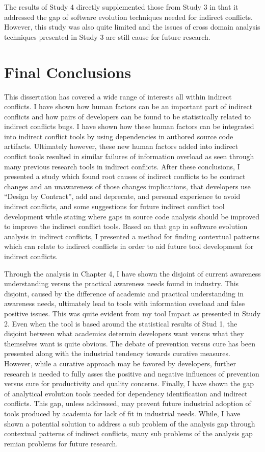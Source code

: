 The results of Study 4 directly supplemented those from Study 3 in that it addressed the gap of software evolution techniques
needed for indirect conflicts. However, this study was also quite limited and the issues of cross domain analysis techniques
presented in Study 3 are still cause for future research.

\section{Final Conclusions}

This dissertation has covered a wide range of interests all within indirect conflicts. I have shown how human factors can
be an important part of indirect conflicts and how pairs of developers can be found to be statistically related to indirect
conflicts bugs. I have shown how these human factors can be integrated into indirect conflict tools by using dependencies in 
authored source code artifacts. Ultimately however, these new human factors added into indirect conflict tools resulted in
similar failures of information overload as seen through many previous research tools in indirect conflicts. After these conclusions,
I presented a study which found root causes of indirect conflicts to be contract changes and an unawareness of those changes
implications, that developers use ``Design by Contract'', add and deprecate, and personal experience to avoid indirect conflicts,
and some suggestions for future indirect conflict tool development while stating where gaps in source code analysis should
be improved to improve the indirect conflict tools. Based on that gap in
software evolution analysis in indirect conflicts, I presented a method for finding contextual patterns which can relate to
indirect conflicts in order to aid future tool development for indirect conflicts.


Through the analysis in Chapter 4, I have shown the disjoint of current awareness understanding versus the practical
awareness needs found in industry. This disjoint, caused by the difference of academic and practical understanding in awareness needs,
ultimately lead to tools with information overload and false positive issues. This was quite evident from my tool Impact as
presented in Study 2. Even when the tool is based around the statistical results of Stud 1, the disjoint between what academics
determin developers want versus what they themselves want is quite obvious. The debate of prevention versus cure has been presented along with
the industrial tendency towards curative measures. However, while a curative approach may be favored by developers, further research is needed
to fully asses the positive and negative influences of prevention versus cure for productivity and quality concerns. Finally, I have shown
the gap of analytical evolution tools needed for dependency identification and indirect conflicts. This gap, unless addressed, may prevent
future industrial adoption of tools produced by academia for lack of fit in industrial needs. While, I have shown a potential solution to address
a sub problem of the analysis gap through contextual patterns of indirect conflicts, many sub problems of the analysis gap remian problems
for future research.
